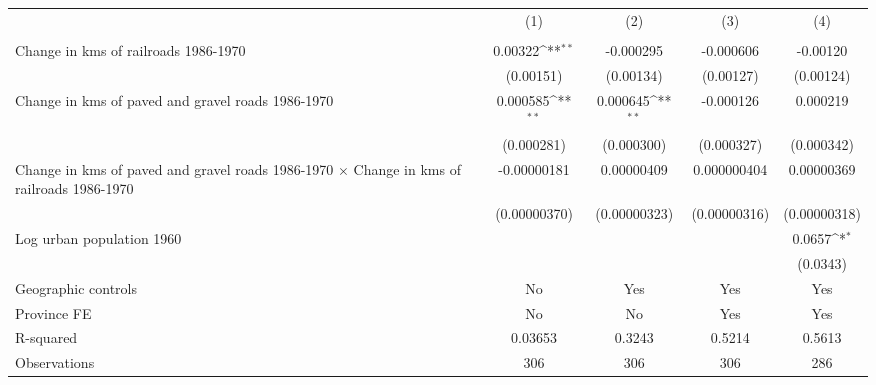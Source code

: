 {
\def\sym#1{\ifmmode^{#1}\else\(^{#1}\)\fi}
\begin{tabular}{l*{4}{c}}
\hline\hline
                &\multicolumn{1}{c}{(1)}&\multicolumn{1}{c}{(2)}&\multicolumn{1}{c}{(3)}&\multicolumn{1}{c}{(4)}\\
                &\multicolumn{1}{c}{}&\multicolumn{1}{c}{}&\multicolumn{1}{c}{}&\multicolumn{1}{c}{}\\
\hline
Change in kms of railroads 1986-1970&  0.00322\sym{**} &-0.000295         &-0.000606         & -0.00120         \\
                &(0.00151)         &(0.00134)         &(0.00127)         &(0.00124)         \\
[1em]
Change in kms of paved and gravel roads 1986-1970& 0.000585\sym{**} & 0.000645\sym{**} &-0.000126         & 0.000219         \\
                &(0.000281)         &(0.000300)         &(0.000327)         &(0.000342)         \\
[1em]
Change in kms of paved and gravel roads 1986-1970 $\times$ Change in kms of railroads 1986-1970&-0.00000181         &0.00000409         &0.000000404         &0.00000369         \\
                &(0.00000370)         &(0.00000323)         &(0.00000316)         &(0.00000318)         \\
[1em]
Log urban population 1960&                  &                  &                  &   0.0657\sym{*}  \\
                &                  &                  &                  & (0.0343)         \\
\hline
Geographic controls&       No         &      Yes         &      Yes         &      Yes         \\
Province FE     &       No         &       No         &      Yes         &      Yes         \\
R-squared       &  0.03653         &   0.3243         &   0.5214         &   0.5613         \\
Observations    &      306         &      306         &      306         &      286         \\
\hline\hline
\end{tabular}
}
